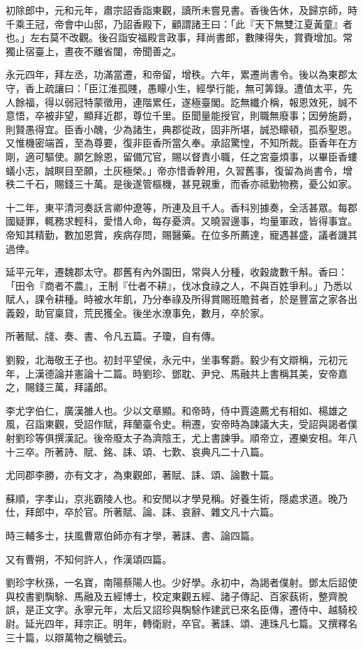 \begin{pinyinscope}
初除郎中，元和元年，肅宗詔香詣東觀，讀所未嘗見書。香後告休，及歸京師，時千乘王冠，帝會中山邸，乃詔香殿下，顧謂諸王曰：「此『天下無雙江夏黃童』者也。」左右莫不改觀。後召詣安福殿言政事，拜尚書郎，數陳得失，賞賚增加。常獨止宿臺上，晝夜不離省闥，帝聞善之。

永元四年，拜左丞，功滿當遷，和帝留，增秩。六年，累遷尚書令。後以為東郡太守，香上疏讓曰：「臣江淮孤賤，愚矇小生，經學行能，無可筭錄。遭值太平，先人餘福，得以弱冠特蒙徵用，連階累任，遂極臺閣。訖無纖介稱，報恩效死，誠不意悟，卒被非望，顯拜近郡，尊位千里。臣聞量能授官，則職無廢事；因勞施爵，則賢愚得宜。臣香小醜，少為諸生，典郡從政，固非所堪，誠恐矇頓，孤忝聖恩。又惟機密端首，至為尊要，復非臣香所當久奉。承詔驚惶，不知所裁。臣香年在方剛，適可驅使。願乞餘恩，留備冗官，賜以督責小職，任之宮臺煩事，以畢臣香螻蟻小志，誠瞑目至願，土灰極榮。」帝亦惜香幹用，久習舊事，復留為尚書令，增秩二千石，賜錢三十萬。是後遂管樞機，甚見親重，而香亦祗勤物務，憂公如家。

十二年，東平清河奏訞言卿仲遼等，所連及且千人。香科別據奏，全活甚眾。每郡國疑罪，輒務求輕科，愛惜人命，每存憂濟。又曉習邊事，均量軍政，皆得事宜。帝知其精勤，數加恩賞，疾病存問，賜醫藥。在位多所薦達，寵遇甚盛，議者譏其過倖。

延平元年，遷魏郡太守。郡舊有內外園田，常與人分種，收穀歲數千斛。香曰：「田令『商者不農』，王制『仕者不耕』，伐冰食祿之人，不與百姓爭利。」乃悉以賦人，課令耕種。時被水年飢，乃分奉祿及所得賞賜班贍貧者，於是豐富之家各出義穀，助官稟貸，荒民獲全。後坐水潦事免，數月，卒於家。

所著賦、牋、奏、書、令凡五篇。子瓊，自有傳。

劉毅，北海敬王子也。初封平望侯，永元中，坐事奪爵。毅少有文辯稱，元初元年，上漢德論并憲論十二篇。時劉珍、鄧耽、尹兌、馬融共上書稱其美，安帝嘉之，賜錢三萬，拜議郎。

李尤字伯仁，廣漢雒人也。少以文章顯。和帝時，侍中賈逵薦尤有相如、楊雄之風，召詣東觀，受詔作賦，拜蘭臺令史。稍遷，安帝時為諫議大夫，受詔與謁者僕射劉珍等俱撰漢記。後帝廢太子為濟陰王，尤上書諫爭。順帝立，遷樂安相。年八十三卒。所著詩、賦、銘、誄、頌、七歎、哀典凡二十八篇。

尤同郡李勝，亦有文才，為東觀郎，著賦、誄、頌、論數十篇。

蘇順，字孝山，京兆霸陵人也。和安閒以才學見稱。好養生術，隱處求道。晚乃仕，拜郎中，卒於官。所著賦、論、誄、哀辭、雜文凡十六篇。

時三輔多士，扶風曹眾伯師亦有才學，著誄、書、論四篇。

又有曹朔，不知何許人，作漢頌四篇。

劉珍字秋孫，一名寶，南陽蔡陽人也。少好學。永初中，為謁者僕射。鄧太后詔使與校書劉騊駼、馬融及五經博士，校定東觀五經、諸子傳記、百家蓺術，整齊脫誤，是正文字。永寧元年，太后又詔珍與騊駼作建武已來名臣傳，遷侍中、越騎校尉。延光四年，拜宗正。明年，轉衛尉，卒官。著誄、頌、連珠凡七篇。又撰釋名三十篇，以辯萬物之稱號云。


\end{pinyinscope}
